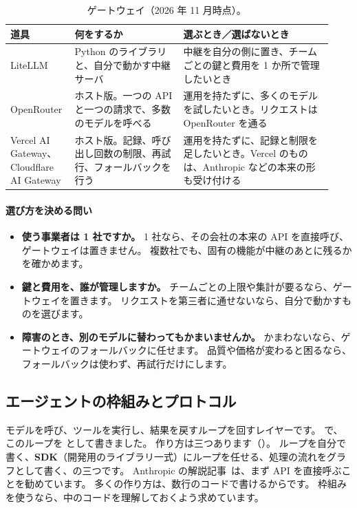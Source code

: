 \begin{table}[htbp]
\centering\footnotesize
\caption{ゲートウェイ（2026 年 11 月時点）。}
\label{tab:tm-gateway}
\begin{tabular}{@{}>{\raggedright\arraybackslash}p{0.17\linewidth}>{\raggedright\arraybackslash}p{0.32\linewidth}>{\raggedright\arraybackslash}p{0.44\linewidth}@{}}
\toprule
道具 & 何をするか & 選ぶとき／選ばないとき \\
\midrule
LiteLLM & Python のライブラリと、自分で動かす中継サーバ & 中継を自分の側に置き、チームごとの鍵と費用を 1 か所で管理したいとき \\
\addlinespace[2pt]
OpenRouter & ホスト版。一つの API と一つの請求で、多数のモデルを呼べる & 運用を持たずに、多くのモデルを試したいとき。リクエストは OpenRouter を通る \\
\addlinespace[2pt]
Vercel AI Gateway、Cloudflare AI Gateway & ホスト版。記録、呼び出し回数の制限、再試行、フォールバックを行う & 運用を持たずに、記録と制限を足したいとき。Vercel のものは、Anthropic などの本来の形も受け付ける \\
\bottomrule
\end{tabular}
\end{table}

\paragraph{選び方を決める問い}
\begin{itemize}[nosep,beginpenalty=10000]
\item \textbf{使う事業者は 1 社ですか。}
  1 社なら、その会社の本来の API を直接呼び、ゲートウェイは置きません。
  複数社でも、固有の機能が中継のあとに残るかを確かめます。
\item \textbf{鍵と費用を、誰が管理しますか。}
  チームごとの上限や集計が要るなら、ゲートウェイを置きます。
  リクエストを第三者に通せないなら、自分で動かすものを選びます。
\item \textbf{障害のとき、別のモデルに替わってもかまいませんか。}
  かまわないなら、ゲートウェイのフォールバックに任せます。
  品質や価格が変わると困るなら、フォールバックは使わず、再試行だけにします。
\end{itemize}

\subsection{エージェントの枠組みとプロトコル}\label{sec:tm-agent}

モデルを呼び、ツールを実行し、結果を戻すループを回すレイヤーです。
で、このループを  として書きました。
作り方は三つあります（）。
ループを自分で書く、\textbf{SDK}（開発用のライブラリ一式）にループを任せる、処理の流れをグラフとして書く、の三つです。
Anthropic の解説記事~\cite{anthropic2024agents}は、まず API を直接呼ぶことを勧めています。
多くの作り方は、数行のコードで書けるからです。
枠組みを使うなら、中のコードを理解しておくよう求めています。

